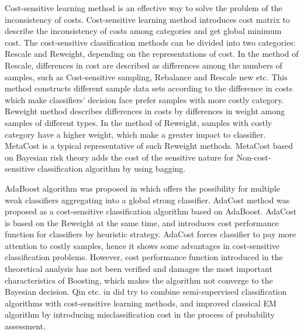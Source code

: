 \documentclass{svjour3}                     %
\begin{document}
Cost-sensitive learning method is an effective way to solve the problem of the inconsistency of costs. Cost-sensitive learning method introduces cost matrix to describe the inconsistency of costs among categories and get global minimum cost. The cost-sensitive classification methods can be divided into two categories: Rescale and Reweight, depending on the representations of cost. In the method of Rescale, differences in cost are described as differences among the numbers of samples, such as Cost-sensitive sampling\cite{gao2011active}, Rebalance\cite{elkan2001foundations} and Rescale new\cite{zhou2010multi} etc. This method constructs different sample data sets according to the difference in costs which make classifiers' decision face prefer samples with more costly category. Reweight method describes differences in costs by differences in weight among samples of different types. In the method of Reweight, samples with costly category have a higher weight, which make a greater impact to classifier. MetaCost\cite{domingos1999metacost} is a typical representative of such Reweight methods. MetaCost based on Bayesian risk theory adds the cost of the sensitive nature for Non-cost-sensitive classification algorithm by using bagging\cite{khoshgoftaar2011comparing}.

AdaBoost algorithm was proposed in \cite{jin2010multi} which offers the possibility for multiple weak classifiers aggregating into a global strong classifier. AdaCost method\cite{fan1999adacost} was proposed as a cost-sensitive classification algorithm based on AdaBoost. AdaCost is based on the Reweight at the same time, and introduces cost performance function for classifiers by heuristic strategy. AdaCost forces classifier to pay more attention to costly samples, hence it shows some advantages in cost-sensitive classification problems. However, cost performance function introduced in the theoretical analysis has not been verified and damages the most important characteristics of Boosting,  which makes the algorithm not converge to the Bayesian decision. Qin etc. in \cite{qin2008cost} did try to combine semi-supervised classification algorithms with cost-sensitive learning methods, and improved classical EM algorithm by introducing misclassification cost in the process of probability assessment.
\end{document}
